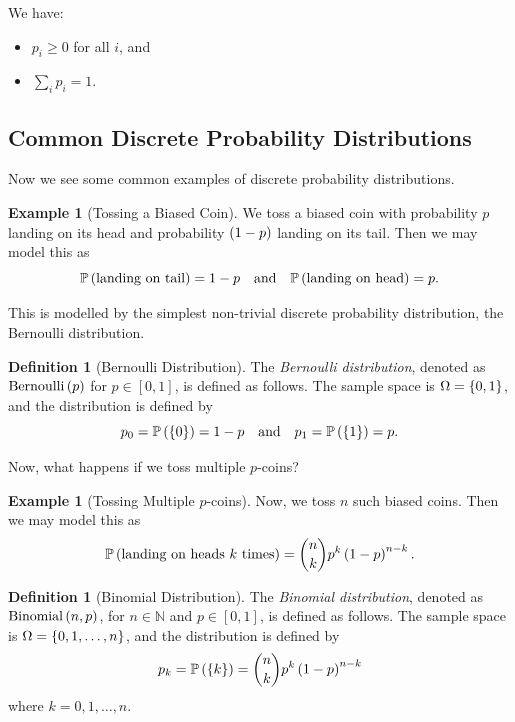 \documentclass{article}
\theoremstyle{definition}
\newtheorem{definition}[theorem]{Definition}
\newtheorem{example}[theorem]{Example}
\theoremstyle{remark}
\newcommand{\NN}{\mathbb{N}}
\newcommand{\Prob}{\mathbb{P}}
\newcommand{\ccintv}[2]{[#1,#2]}
\newcommand{\qand}{\quad\text{and}\quad}
\newcommand{\Bernoulli}{\operatorname{Bernoulli}}
\newcommand{\Binomial}{\operatorname{Binomial}}
\begin{document}
We have:
\begin{itemize}
    \item \(p_i \geq 0\) for all \(i\), and
    \item \(\sum_i p_i = 1\).
\end{itemize}

\subsection{Common Discrete Probability Distributions}

Now we see some common examples of discrete probability distributions.

\begin{example}[Tossing a Biased Coin]
    \label{ex:tossing-biased-coin}%
    We toss a biased coin with probability \(p\) landing on its head and probability \(\left(1 - p\right)\) landing on its tail. Then we may model this as
    \[
        \Prob\pqty{\text{landing on tail}} = 1 - p \qand \Prob\pqty{\text{landing on head}} = p.
    \]
\end{example}

This is modelled by the simplest non-trivial discrete probability distribution, the Bernoulli distribution.

\begin{definition}[Bernoulli Distribution]
    \label{def:bernoulli-distribution}%
    The \emph{Bernoulli distribution}, denoted as \(\Bernoulli\pqty{p}\) for \(p \in \ccintv{0}{1}\), is defined as follows. The sample space is \(\Omega = \left\{0, 1\right\}\), and the distribution is defined by
    \[
        p_0 = \Prob\pqty{\Bqty{0}} = 1 - p \qand p_1 = \Prob\pqty{\Bqty{1}} = p.
    \]
\end{definition}

Now, what happens if we toss multiple \(p\)-coins? 

\begin{example}[Tossing Multiple \(p\)-coins]
    \label{ex:tossing-multiple-biased-coins}%
    Now, we toss \(n\) such biased coins. Then we may model this as
    \[
        \Prob\pqty{\text{landing on heads }k\text{ times}} = \binom{n}{k} p^k \pqty{1 - p}^{n - k}.
    \]
\end{example}

\begin{definition}[Binomial Distribution]
    \label{def:binomial-distribution}%
    The \emph{Binomial distribution}, denoted as \(\Binomial\pqty{n, p}\), for \(n \in \NN\) and \(p \in \ccintv{0}{1}\), is defined as follows. The sample space is \(\Omega = \left\{0, 1, \ldots, n\right\}\), and the distribution is defined by
    \[
        p_k = \Prob\pqty{\Bqty{k}}= \binom{n}{k} p^k \pqty{1 - p}^{n - k}
    \]
    where \(k = 0, 1, \ldots, n\).
\end{definition}
\end{document}
